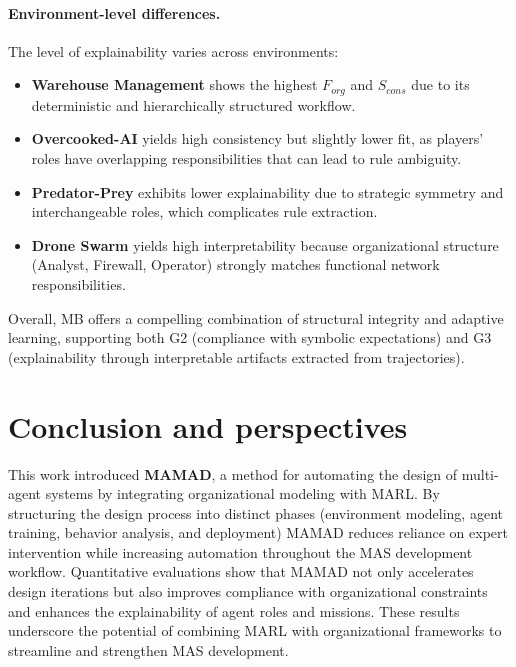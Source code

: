 \documentclass[pdflatex,sn-mathphys-num]{sn-jnl}%
\theoremstyle{thmstyleone}%
\theoremstyle{thmstyletwo}%
\theoremstyle{thmstylethree}%
\begin{document}
\paragraph*{Environment-level differences.}
The level of explainability varies across environments:

\begin{itemize}
    \item \textbf{Warehouse Management} shows the highest $F_{org}$ and $S_{cons}$
          due to its deterministic and hierarchically structured workflow.
    \item \textbf{Overcooked-AI} yields high consistency but slightly lower fit, as
          players' roles have overlapping responsibilities that can lead to rule
          ambiguity.
    \item \textbf{Predator-Prey} exhibits lower explainability due to strategic
          symmetry and interchangeable roles, which complicates rule extraction.
    \item \textbf{Drone Swarm} yields high interpretability because organizational
          structure (Analyst, Firewall, Operator) strongly matches functional network
          responsibilities.
\end{itemize}

Overall, MB offers a compelling combination of structural integrity and adaptive
learning, supporting both G2 (compliance with symbolic expectations) and G3
(explainability through interpretable artifacts extracted from trajectories).



\section{Conclusion and perspectives}\label{sec:conclusion}

This work introduced \textbf{MAMAD}, a method for automating the design of multi-agent systems by integrating organizational modeling with MARL. By structuring the design process into distinct phases (environment modeling, agent training, behavior analysis, and deployment) MAMAD reduces reliance on expert intervention while increasing automation throughout the MAS development workflow. Quantitative evaluations show that MAMAD not only accelerates design iterations but also improves compliance with organizational constraints and enhances the explainability of agent roles and missions. These results underscore the potential of combining MARL with organizational frameworks to streamline and strengthen MAS development.
\end{document}
